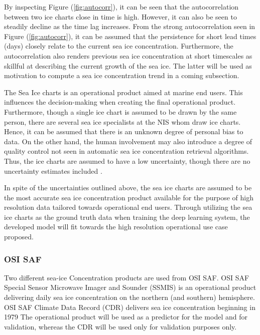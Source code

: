 \documentclass[../main/thesis.tex]{subfiles}
\begin{document}
By inspecting Figure (\ref{fig:autocorr}), it can be seen that the autocorrelation between two ice charts close in time is high. However, it can also be seen to steadily decline as the time lag increases. From the strong autocorrelation seen in Figure (\ref{fig:autocorr}), it can be assumed that the persistence for short lead times (days) closely relate to the current sea ice concentration. Furthermore, the autocorrelation also renders previous sea ice concentration at short timescales as skillful at describing the current growth of the sea ice. The latter will be used as motivation to compute a sea ice concentration trend in a coming subsection.

The Sea Ice charts is an operational product aimed at marine end users. This influences the decision-making when creating the final operational product. Furthermore, though a single ice chart is assumed to be drawn by the same person, there are several sea ice specialists at the NIS whom draw ice charts. Hence, it can be assumed that there is an unknown degree of personal bias to data. On the other hand, the human involvement may also introduce a degree of quality control not seen in automatic sea ice concentration retrieval algorithms. Thus, the ice charts are assumed to have a low uncertainty, though there are no uncertainty estimates included \citep{Dinessen2020}.

In spite of the uncertainties outlined above, the sea ice charts are assumed to be the most accurate sea ice concentration product available for the purpose of high resolution data tailored towards operational end users. Through utilizing the sea ice charts as the ground truth data when training the deep learning system, the developed model will fit towards the high resolution operational use case proposed.

\subsubsection{OSI SAF}
\label{sec:osisaf}
Two different sea-ice Concentration products are used from OSI SAF. OSI SAF Special Sensor Microwave Imager and Sounder (SSMIS) is an operational product delivering daily sea ice concentration on the northern (and southern) hemisphere. OSI SAF Climate Data Record (CDR) \citep{Soerensen2021} delivers sea ice concentration beginning in 1979 \citep{Lavergne2019} The operational product will be used as a predictor for the model and for validation, whereas the CDR will be used only for validation purposes only.
\end{document}
